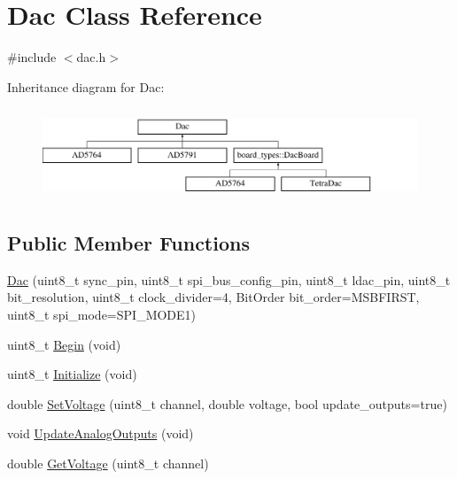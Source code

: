 \hypertarget{classDac}{}\section{Dac Class Reference}
\label{classDac}


{\ttfamily \#include $<$dac.\+h$>$}

Inheritance diagram for Dac\+:\begin{figure}[H]
\begin{center}
\leavevmode
\includegraphics[height=2.745098cm]{classDac}
\end{center}
\end{figure}
\subsection*{Public Member Functions}
\begin{DoxyCompactItemize}
\item 
\mbox{\hyperlink{classDac_a43b0ea171bf0dfad95427e9751b6e191}{Dac}} (uint8\+\_\+t sync\+\_\+pin, uint8\+\_\+t spi\+\_\+bus\+\_\+config\+\_\+pin, uint8\+\_\+t ldac\+\_\+pin, uint8\+\_\+t bit\+\_\+resolution, uint8\+\_\+t clock\+\_\+divider=4, Bit\+Order bit\+\_\+order=M\+S\+B\+F\+I\+R\+ST, uint8\+\_\+t spi\+\_\+mode=S\+P\+I\+\_\+\+M\+O\+D\+E1)
\item 
uint8\+\_\+t \mbox{\hyperlink{classDac_a342bb811b205d50baacb3211e89ea062}{Begin}} (void)
\item 
uint8\+\_\+t \mbox{\hyperlink{classDac_aea1f5f36c9371ebc1527e848ce67e47a}{Initialize}} (void)
\item 
double \mbox{\hyperlink{classDac_ab2f0e36184b9b529de04136c36a3a51b}{Set\+Voltage}} (uint8\+\_\+t channel, double voltage, bool update\+\_\+outputs=true)
\item 
void \mbox{\hyperlink{classDac_aafef1707ec33a2166a69e9b646cd471b}{Update\+Analog\+Outputs}} (void)
\item 
double \mbox{\hyperlink{classDac_ad51bf5450f03f39a0357398af69f1705}{Get\+Voltage}} (uint8\+\_\+t channel)
\end{DoxyCompactItemize}
